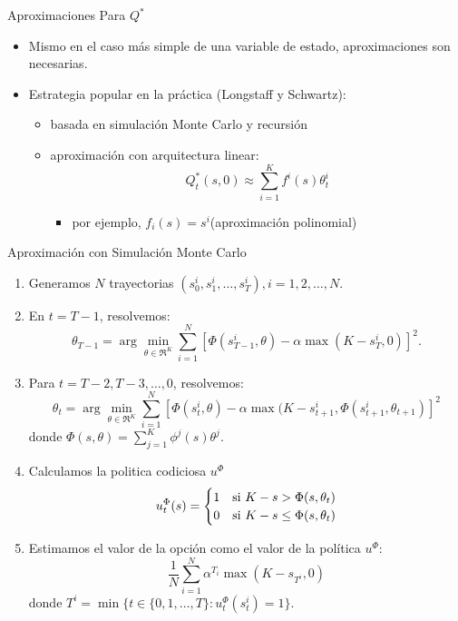 \documentclass[handout]{beamer}
\begin{document}
\begin{frame}{Aproximaciones Para $Q^*$}
\begin{itemize}
\item Mismo en el caso más simple de una variable de estado, aproximaciones son necesarias.
\item<2-> Estrategia popular en la práctica (Longstaff y Schwartz):
\begin{itemize}
\item<3-> basada en simulación Monte Carlo y recursión
\item<4->aproximación con arquitectura linear:
$$
Q_t^*(s,0) \approx \sum_{i=1}^K f^i(s)\theta_t^i
$$
\begin{itemize}
\item<5-> por ejemplo, $f_i(s) = s^i$(aproximación polinomial)
\end{itemize}
\end{itemize}
\end{itemize}    
\end{frame}

\begin{frame}{Aproximación con Simulación Monte Carlo}
\begin{enumerate}
\item Generamos $N$ trayectorias $(s_0^i,s_1^i,\dots,s_T^i),i=1,2,\dots,N$.
\item<2-> En $t = T-1$, resolvemos:
{\small$$
\theta_{T-1} = \arg\min_{\theta \in \Re^K} \sum_{i=1}^N\left[\Phi(s_{T-1}^i,\theta)-\alpha \max(K-s_T^i,0)\right]^2.
$$}
\item<3-> Para $t = T-2, T-3,\dots,0$, resolvemos:
{\small $$
\theta_t = \arg\min_{\theta \in \Re^K} \sum_{i=1}^N\left[\Phi(s_t^i,\theta)-\alpha \max(K-s_{t+1}^i,\Phi(s_{t+1}^i,\theta_{t+1})\right]^2 
$$}
donde $\Phi(s,\theta) = \sum_{j=1}^K \phi^j(s)\theta^j$.
\item<4-> Calculamos la politica codiciosa $u^\Phi$
{\small
$$
u^\Phi_t(s) = \begin{cases}
1 & {\rm si~} K-s > \Phi(s,\theta_t) \\
0 & {\rm si~} K-s \leq \Phi(s,\theta_t)
\end{cases}
$$}
\item<5-> Estimamos el valor de la opción como el valor de la política $u^\Phi$:
{\small $$
\frac{1}{N}\sum_{i=1}^N \alpha^{T_i}\max(K-s_{T^i},0)
$$}
donde $T^i = \min \{t \in \{0,1,\dots,T\}: u^\Phi_t(s_t^i) = 1\}$.
\end{enumerate}
\end{frame}
\end{document}
